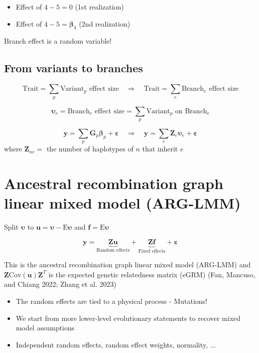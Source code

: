 \documentclass[
  letterpaper,
  DIV=11,
  numbers=noendperiod]{scrartcl}
\providecommand{\tightlist}{%
  \setlength{\itemsep}{0pt}\setlength{\parskip}{0pt}}\usepackage{longtable,booktabs,array}
\begin{document}
\begin{itemize}
\tightlist
\item
  Effect of \(4-5 = 0\) (1st realization)
\end{itemize}

\begin{itemize}
\tightlist
\item
  Effect of \(4-5 = \boldsymbol{\beta}_4\) (2nd realization)
\end{itemize}

Branch effect is a random variable!

\subsection{From variants to branches}\label{from-variants-to-branches}

\[
\text{Trait} = \sum_p \text{Variant$_p$ effect size} 
\quad
\Rightarrow 
\quad
\text{Trait} = \sum_e \text{Branch$_e$ effect size}
\]

\[
\boldsymbol{\upsilon}_e = \text{Branch$_e$ effect size} = \sum_p \text{Variant$_p$ on Branch$_e$}
\]

\[
\mathbf{y} = \sum_p \mathbf{G}_p\boldsymbol{\beta}_p + \boldsymbol{\varepsilon}
\quad
\Rightarrow
\quad
\mathbf{y} = \sum_e \mathbf{Z}_e\boldsymbol{\upsilon}_e + \boldsymbol{\varepsilon} 
\] where \(\mathbf{Z}_{ne}=\) the number of haplotypes of \(n\) that
inherit \(e\)

\section{Ancestral recombination graph linear mixed model
(ARG-LMM)}\label{ancestral-recombination-graph-linear-mixed-model-arg-lmm}

Split \(\boldsymbol{\upsilon}\) to
\(\mathbf{u} = \boldsymbol{\upsilon} - \mathrm{E}\boldsymbol{\upsilon}\)
and \(\mathbf{f}= \mathrm{E}\boldsymbol{\upsilon}\)

\[
\mathbf{y} = \underbrace{\mathbf{Z} \mathbf{u}}_{\text{Random effects}} + \underbrace{\mathbf{Z} \mathbf{f}}_{\text{Fixed effects}} + \boldsymbol{\varepsilon}
\]

This is the ancestral recombination graph linear mixed model (ARG-LMM)
and \(\mathbf{Z} \mathrm{Cov}(\mathbf{u}) \mathbf{Z}^T\) is the expected
genetic relatedness matrix (eGRM) (Fan, Mancuso, and Chiang 2022; Zhang
et al. 2023)

\begin{itemize}
\tightlist
\item
  The random effects are tied to a physical process - Mutations!
\item
  We start from more lower-level evolutionary statements to recover
  mixed model assumptions
\item
  Independent random effects, random effect weights, normality,
  \(\ldots\)
\end{itemize}
\end{document}
